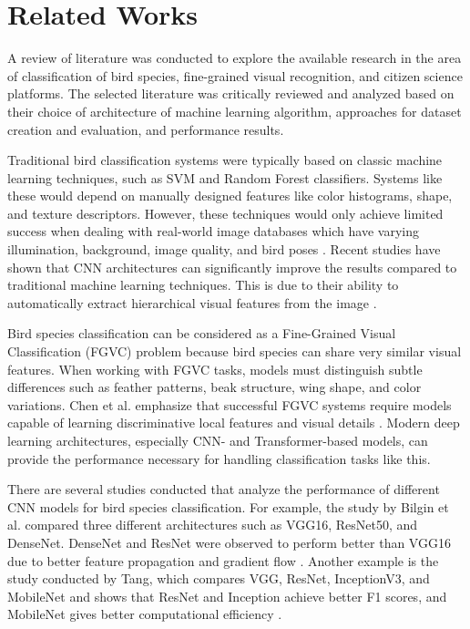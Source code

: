 \section{Related Works}

A review of literature was conducted to explore the available research in the area of 
classification of bird species, fine-grained visual recognition, and citizen science 
platforms. The selected literature was critically reviewed and analyzed based on their 
choice of architecture of machine learning algorithm, approaches for dataset creation 
and evaluation, and performance results.

Traditional bird classification systems were typically based on classic machine learning
techniques, such as SVM and Random Forest classifiers. Systems like these would depend
on manually designed features like color histograms, shape, and texture descriptors.
However, these techniques would only achieve limited success when dealing with real-world
image databases which have varying illumination, background, image quality,
and bird poses \cite{kambali2024automated, lolge2025evolution}. Recent studies
have shown that CNN architectures can significantly improve the results compared to
traditional machine learning techniques. This is due to their ability to automatically extract hierarchical
visual features from the image \cite{kambali2024automated}.

Bird species classification can be considered as a Fine-Grained Visual Classification
(FGVC) problem because bird species can share very similar visual features.
When working with FGVC tasks, models must distinguish subtle differences such as
feather patterns, beak structure, wing shape, and color variations. Chen et al. emphasize
that successful FGVC systems require models capable of learning discriminative local
features and visual details \cite{chen2024fetfgvc}. Modern deep learning architectures,
especially CNN- and Transformer-based models, can provide the performance necessary for
handling classification tasks like this.

There are several studies conducted that analyze the performance of different CNN models for bird species classification.
For example, the study by Bilgin et al. compared three different architectures such as VGG16, ResNet50, and DenseNet. 
DenseNet and ResNet were observed to perform better than VGG16 due to better feature propagation and gradient flow \cite{bilgin2022bird}.
Another example is the study conducted by Tang, which compares VGG, ResNet, InceptionV3, and MobileNet and shows that ResNet and Inception 
achieve better F1 scores, and MobileNet gives better computational efficiency \cite{tang2025comparative}.

